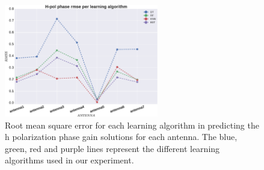 \begin{figure}[H]
  \centering
    \includegraphics[width=0.6\textwidth]{images/Hpol-phase.eps}
    \caption{Root mean square error for each learning algorithm in predicting the h polarization phase gain solutions for each antenna. The blue, green, red and purple lines represent the different learning algorithms used in our experiment.}
  \label{phrm}
 \end{figure}
